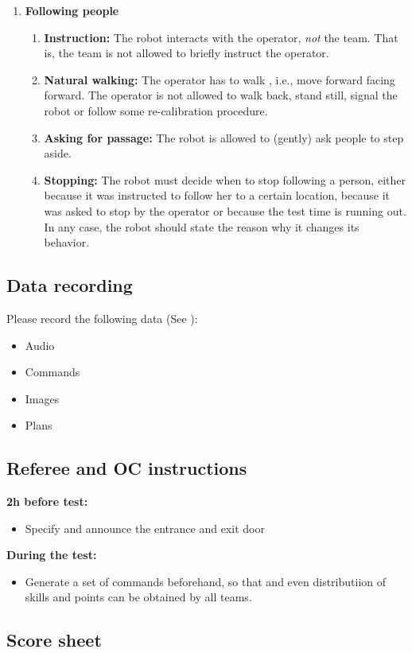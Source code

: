 \begin{enumerate}
\begin{enumerate}
	\end{enumerate}
	\item \textbf{Following people} 
	\begin{enumerate}
		\item \textbf{Instruction:} The robot interacts with the operator, \emph{not} the team. That is, the team is not allowed to briefly instruct the operator.
		\item \textbf{Natural walking:} The operator has to walk , i.e., move forward facing forward. The operator is not allowed to walk back, stand still, signal the robot or follow some re-calibration procedure.
		\item \textbf{Asking for passage:} The robot is allowed to (gently) ask people to step aside.
		\item \textbf{Stopping:} The robot must decide when to stop following a person, either because it was instructed to follow her to a certain location, because it was asked to stop by the operator or because the test time is running out. In any case, the robot should state the reason why it changes its behavior.
	\end{enumerate}
\end{enumerate}

\subsection{Data recording}
  Please record the following data (See ):
  \begin{itemize}
   \item Audio
   \item Commands
   \item Images
   \item Plans
  \end{itemize}


\subsection{Referee and OC instructions}
\textbf{2h before test:}
\begin{itemize}
\item Specify and announce the entrance and exit door
\end{itemize}
\textbf{During the test:}
\begin{itemize}
\item Generate a set of commands beforehand, so that and even distributiion of skills and points can be obtained by all teams. 
\end{itemize}

\newpage
\subsection{Score sheet}


